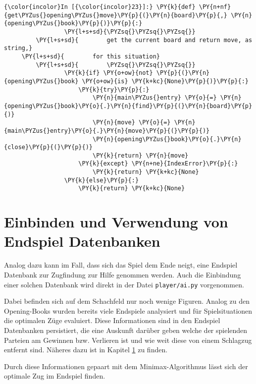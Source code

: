 \begin{Verbatim}[commandchars=\\\{\}]
{\color{incolor}In [{\color{incolor}23}]:} \PY{k}{def} \PY{n+nf}{get\PYZus{}opening\PYZus{}move}\PY{p}{(}\PY{n}{board}\PY{p}{,} \PY{n}{opening\PYZus{}book}\PY{p}{)}\PY{p}{:}
                 \PY{l+s+sd}{\PYZsq{}\PYZsq{}\PYZsq{}}
         \PY{l+s+sd}{        get the current board and return move, as string,}
	 \PY{l+s+sd}{        for this situation}
         \PY{l+s+sd}{        \PYZsq{}\PYZsq{}\PYZsq{}}
                 \PY{k}{if} \PY{o+ow}{not} \PY{p}{(}\PY{n}{opening\PYZus{}book} \PY{o+ow}{is} \PY{k+kc}{None}\PY{p}{)}\PY{p}{:}
                     \PY{k}{try}\PY{p}{:}
                         \PY{n}{main\PYZus{}entry} \PY{o}{=} \PY{n}{opening\PYZus{}book}\PY{o}{.}\PY{n}{find}\PY{p}{(}\PY{n}{board}\PY{p}{)}
                         \PY{n}{move} \PY{o}{=} \PY{n}{main\PYZus{}entry}\PY{o}{.}\PY{n}{move}\PY{p}{(}\PY{p}{)}
                         \PY{n}{opening\PYZus{}book}\PY{o}{.}\PY{n}{close}\PY{p}{(}\PY{p}{)}
                         \PY{k}{return} \PY{n}{move}
                     \PY{k}{except} \PY{n+ne}{IndexError}\PY{p}{:}
                         \PY{k}{return} \PY{k+kc}{None}
                 \PY{k}{else}\PY{p}{:}
                     \PY{k}{return} \PY{k+kc}{None}
\end{Verbatim}

    \section{Einbinden und Verwendung von Endspiel
Datenbanken}\label{einbinden-und-verwendung-von-endspiel-datenbanken}

Analog dazu kann im Fall, dass sich das Spiel dem Ende neigt, eine
Endspiel Datenbank zur Zugfindung zur Hilfe genommen werden. Auch die
Einbindung einer solchen Datenbank wird direkt in der Datei
\texttt{player/ai.py} vorgenommen.

Dabei befinden sich auf dem Schachfeld nur noch wenige Figuren. Analog
zu den Opening-Books wurden bereits viele Endspiele analysiert und für
Spielsituationen die optimalen Züge evaluiert. Diese Informationen sind
in den Endspiel Datenbanken persistiert, die eine Auskunft darüber
geben welche der spielenden Parteien am Gewinnen bzw. Verlieren ist und
wie weit diese von einem Schlagzug entfernt sind. Näheres dazu ist in
Kapitel \ref{einbinden-und-verwendung-von-endspiel-datenbanken} zu finden.

Durch diese Informationen gepaart mit dem Minimax-Algorithmus lässt sich
der optimale Zug im Endspiel finden.

